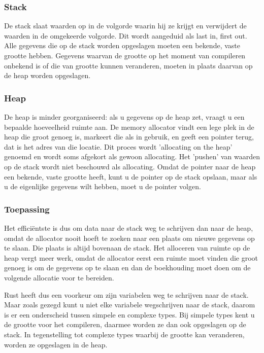 \subsubsection{Stack}

De stack slaat waarden op in de volgorde waarin hij ze krijgt en verwijdert de waarden in de
omgekeerde volgorde. Dit wordt aangeduid als last in, first out. Alle gegevens die op de stack
worden opgeslagen moeten een bekende, vaste grootte hebben. Gegevens waarvan de grootte op het
moment van compileren onbekend is of die van grootte kunnen veranderen, moeten in plaats daarvan op
de heap worden opgeslagen. 

\subsubsection{Heap}

De heap is minder georganiseerd: als u gegevens op de heap zet, vraagt u een bepaalde hoeveelheid
ruimte aan. De memory allocator vindt een lege plek in de heap die groot genoeg is, markeert die als
in gebruik, en geeft een pointer terug, dat is het adres van die locatie. Dit proces wordt
'allocating on the heap' genoemd en wordt soms afgekort als gewoon allocating. Het 'pushen' van
waarden op de stack wordt niet beschouwd als allocating. Omdat de pointer naar de heap een bekende,
vaste grootte heeft, kunt u de pointer op de stack opslaan, maar als u de eigenlijke gegevens wilt
hebben, moet u de pointer volgen. 

\subsubsection{Toepassing}

Het efficiëntste is dus om data naar de stack weg te schrijven dan naar de heap, omdat de allocator
nooit hoeft te zoeken naar een plaats om nieuwe gegevens op te slaan. Die plaats is altijd bovenaan
de stack. Het alloceren van ruimte op de heap vergt meer werk, omdat de allocator eerst een ruimte
moet vinden die groot genoeg is om de gegevens op te slaan en dan de boekhouding moet doen om de
volgende allocatie voor te bereiden. 

Rust heeft dus een voorkeur om zijn variabelen weg te schrijven naar de stack. Maar zoals gezegd
kunt u niet elke variabele wegschrijven naar de stack, daarom is er een onderscheid tussen simpele en
complexe types. Bij simpele types kent u de grootte voor het compileren, daarmee worden ze dan ook
opgeslagen op de stack. In tegenstelling tot complexe types waarbij de grootte kan veranderen,
worden ze opgeslagen in de heap.

